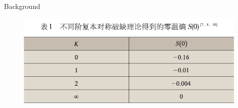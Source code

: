 \documentclass[UTF8]{beamer}
\begin{document}
\begin{frame}{Background}
\begin{minipage}[c]{0.3\linewidth}
\begin{figure}
    \end{figure}
  \end{minipage}
  \hfill
  \begin{minipage}[c]{0.3\linewidth}
    \begin{figure}
      \centering
      \includegraphics[width=1.0\linewidth]{./fig/零温熵.png}
    \end{figure}
  \end{minipage}
\end{frame}
\end{document}
